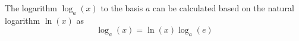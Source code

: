 The logarithm $\log_a(x)$ to the basis $a$ can be calculated based on the natural logarithm $\ln(x)$ as
$$\log_a(x) = \ln(x) \log_a(e)$$
